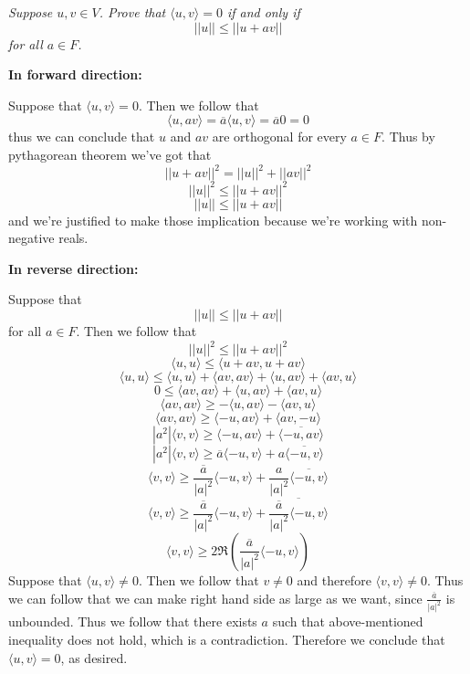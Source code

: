 \documentclass[11pt,oneside,titlepage]{book}
\begin{document}
\textit{Suppose $u, v \in V$. Prove that $\langle u, v \rangle = 0$ if and only if }
$$||u|| \leq ||u + av||$$
\textit{for all $a \in F$.}

\textbf{In forward direction: }

Suppose that $\langle u, v \rangle = 0$. Then we follow that
$$\langle u, av \rangle = \overline{a} \langle u, v \rangle = \overline{a} 0 = 0$$
thus we can conclude that $u$ and $av$ are orthogonal for every $a \in F$. Thus
by pythagorean theorem we've got that
$$||u + av||^2 = ||u||^2 + ||av||^2$$
$$||u||^2 \leq ||u + av||^2$$
$$||u|| \leq ||u + av||$$
and we're justified to make those implication because we're working with non-negative reals.

\textbf{In reverse direction: }

Suppose that
$$||u|| \leq ||u + av||$$
for all $a \in F$. Then we follow that
$$||u||^2 \leq ||u + av||^2$$
$$\langle u, u \rangle \leq \langle u + av, u + av \rangle $$
$$\langle u, u \rangle \leq \langle u, u \rangle  + \langle av, av \rangle +
\langle u, av \rangle + \langle av, u \rangle $$
$$0 \leq \langle av, av \rangle + \langle u, av \rangle + \langle av, u \rangle $$
$$\langle av, av \rangle \geq  - \langle u, av \rangle - \langle av, u \rangle $$
$$\langle av, av \rangle \geq  \langle -u, av \rangle + \langle av, -u \rangle $$
$$|a^2| \langle v, v \rangle \geq  \langle -u, av \rangle + \overline{\langle -u, av \rangle} $$
$$|a^2| \langle v, v \rangle \geq
\overline{a} \langle -u, v \rangle + a \overline{\langle -u, v \rangle} $$
$$ \langle v, v \rangle \geq
\frac{\overline{a}}{|a|^2} \langle -u, v \rangle +
\frac{a}{|a|^2}\overline{\langle -u, v \rangle} $$
$$ \langle v, v \rangle \geq
\frac{\overline{a}}{|a|^2} \langle -u, v \rangle + \overline{
  \frac{\overline{a}}{|a|^2}\langle -u, v \rangle} $$
$$ \langle v, v \rangle \geq
2 \Re {\left(\frac{\overline{a}}{|a|^2} \langle -u, v \rangle \right)} $$
Suppose that $\langle u, v \rangle \neq 0$. Then we follow that $v \neq 0$ and therefore
$\langle v, v \rangle \neq 0$. Thus we can follow that we can make right hand side as large as we
want, since $\frac{\overline{a}}{|a|^2}$ is unbounded. Thus we follow that there exists
$a$ such that above-mentioned inequality does not hold, which is a contradiction. Therefore
we conclude that $\langle u, v \rangle = 0$, as desired.

\subsection{}
\end{document}
